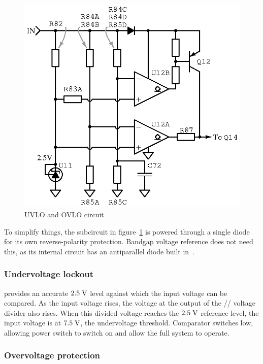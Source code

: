 \begin{figure}[H]
\centering
\includegraphics[]{comparator}
\caption{UVLO and OVLO circuit}
\label{fig:uovlo}
\end{figure}

To simplify things, the subcircuit in figure~\ref{fig:uovlo} is powered through
a single diode for its own reverse-polarity protection. Bandgap voltage reference
 does not need this, as its internal circuit has an antiparallel diode
built in~\cite{tl431}.

\subsubsection{Undervoltage lockout}

 provides an accurate $2.5\;\mathrm{V}$ level against which the input
voltage can be compared. As the input voltage rises, the voltage at the output of
the // voltage divider also rises. When
this divided voltage reaches the $2.5\;\mathrm{V}$ reference level, the input voltage
is at $7.5\;\mathrm{V}$, the undervoltage threshold. Comparator 
switches low, allowing power switch  to switch on and allow the
full system to operate.

\subsubsection{Overvoltage protection}

